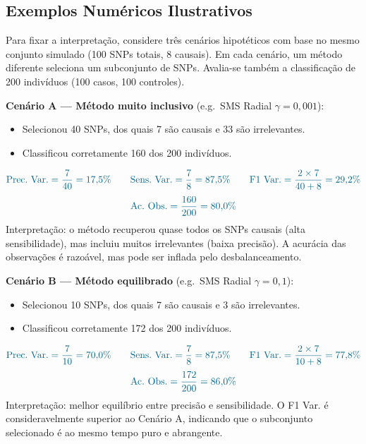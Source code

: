 \documentclass[12pt,a4paper]{article}
\newcommand{\novo}[1]{\textcolor{corNova}{#1}}
\begin{document}
\subsection*{\novo{Exemplos Numéricos Ilustrativos}}

\novo{Para fixar a interpretação, considere três cenários hipotéticos com base no mesmo conjunto simulado (100 SNPs totais, 8 causais). Em cada cenário, um método diferente seleciona um subconjunto de SNPs. Avalia-se também a classificação de 200 indivíduos (100 casos, 100 controles).}

\medskip
\noindent\novo{\textbf{Cenário A --- Método muito inclusivo} (e.g.\ SMS Radial $\gamma = 0{,}001$):}
\begin{itemize}
  \item \novo{Selecionou 40 SNPs, dos quais 7 são causais e 33 são irrelevantes.}
  \item \novo{Classificou corretamente 160 dos 200 indivíduos.}
\end{itemize}
\[
  \novo{\text{Prec.\ Var.} = \frac{7}{40} = 17{,}5\% \qquad
   \text{Sens.\ Var.} = \frac{7}{8} = 87{,}5\% \qquad
   \text{F1\ Var.} = \frac{2\times7}{40+8} = 29{,}2\%}
\]
\[
  \novo{\text{Ac.\ Obs.} = \frac{160}{200} = 80{,}0\%}
\]
\novo{Interpretação: o método recuperou quase todos os SNPs causais (alta sensibilidade), mas incluiu muitos irrelevantes (baixa precisão). A acurácia das observações é razoável, mas pode ser inflada pelo desbalanceamento.}

\medskip
\noindent\novo{\textbf{Cenário B --- Método equilibrado} (e.g.\ SMS Radial $\gamma = 0{,}1$):}
\begin{itemize}
  \item \novo{Selecionou 10 SNPs, dos quais 7 são causais e 3 são irrelevantes.}
  \item \novo{Classificou corretamente 172 dos 200 indivíduos.}
\end{itemize}
\[
  \novo{\text{Prec.\ Var.} = \frac{7}{10} = 70{,}0\% \qquad
   \text{Sens.\ Var.} = \frac{7}{8} = 87{,}5\% \qquad
   \text{F1\ Var.} = \frac{2\times7}{10+8} = 77{,}8\%}
\]
\[
  \novo{\text{Ac.\ Obs.} = \frac{172}{200} = 86{,}0\%}
\]
\novo{Interpretação: melhor equilíbrio entre precisão e sensibilidade. O F1 Var. é consideravelmente superior ao Cenário A, indicando que o subconjunto selecionado é ao mesmo tempo puro e abrangente.}
\end{document}
